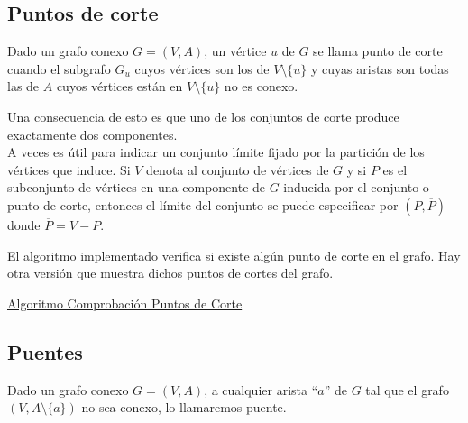 \subsection{Puntos de corte}

\begin{fondo}
Dado un grafo conexo $G = (V,A)$, un vértice $u$ de $G$ se llama punto de corte cuando el subgrafo $G_u$ cuyos vértices son los de $V \setminus \{u\}$ y cuyas aristas son todas las de $A$ cuyos vértices están en $V \setminus \{u\}$ no es conexo.
\end{fondo}

Una consecuencia de esto es que uno de los conjuntos de corte produce exactamente dos componentes.\\

A veces es útil para indicar un conjunto límite fijado por la partición de los vértices que induce. Si $V$ denota al conjunto de vértices de $G$ y si $P$ es el subconjunto de vértices en una componente de $G$ inducida por el conjunto o punto de corte, entonces el límite del conjunto se puede especificar por $(P,\overline P)$ donde $\overline P = V - P$.\\

\begin{nota}
El algoritmo implementado verifica si existe algún punto de corte en el grafo. Hay otra versión que muestra dichos puntos de cortes del grafo.\\
\end{nota}

\underline{Algoritmo Comprobación Puntos de Corte}\\


\subsection{Puentes}

\begin{fondo}
Dado un grafo conexo $G = (V,A)$, a cualquier arista ``$a$'' de $G$ tal que el grafo $(V, A \setminus \{a\})$ no sea conexo, lo llamaremos puente.
\end{fondo}

